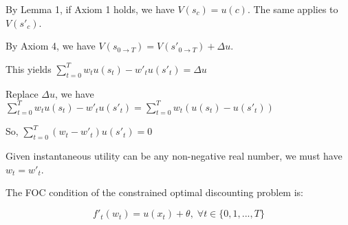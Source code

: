 \documentclass[
  12pt,
]{article}
\begin{document}
By Lemma 1, if Axiom 1 holds, we have \(V(s_c)=u(c)\). The same applies
to \(V(s'_c)\).

By Axiom 4, we have
\(V(s_{0\rightarrow T})=V(s'_{0\rightarrow T})+\Delta u\).

This yields \(\sum_{t=0}^T w_tu(s_t)- w'_tu(s'_t)=\Delta u\)

Replace \(\Delta u\), we have
\(\sum_{t=0}^T w_tu(s_t)- w'_tu(s'_t)=\sum_{t=0}^T w_t(u(s_t)- u(s'_t))\)

So, \(\sum_{t=0}^T (w_t-w'_t) u(s'_t)=0\)

Given instantaneous utility can be any non-negative real number, we must
have \(w_t=w'_t\).

The FOC condition of the constrained optimal discounting problem is:

\[
f'_t(w_t)=u(x_t)+\theta,\; \forall t\in\{0,1,...,T\}
\]

  
\end{document}
